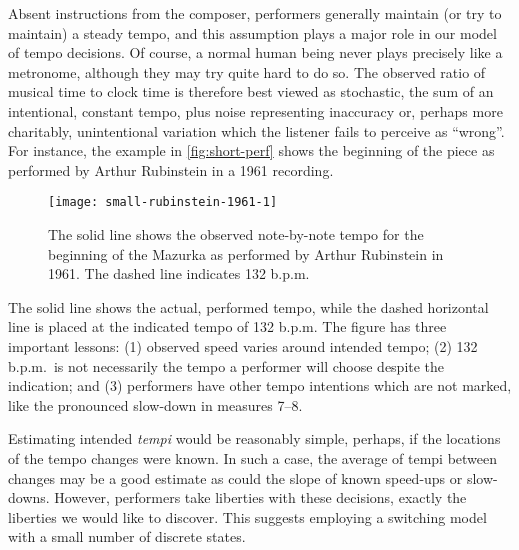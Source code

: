 \documentclass[12pt]{article}
\begin{document}
Absent instructions from the composer, performers generally maintain
(or try to maintain) a steady tempo, and this assumption plays a major
role in our model of tempo decisions. Of course, a normal human being
never plays precisely like a 
metronome, although they may try quite hard to do so. The observed
ratio of musical time to clock time
is therefore best viewed as stochastic, the sum of an
intentional, constant tempo, plus noise representing inaccuracy
or, perhaps more charitably, unintentional variation which the
listener fails to perceive as ``wrong''. For instance, the example in
\autoref{fig:short-perf} shows the beginning of the piece as performed
by Arthur Rubinstein in a 1961 recording. 
\begin{figure}[t!]
 \centering
 \texttt{[image: small-rubinstein-1961-1]}
 \caption{The solid line shows the observed note-by-note tempo for
   the beginning of the Mazurka as performed by Arthur Rubinstein in
   1961. The dashed line indicates 132 b.p.m.}
 \label{fig:short-perf}
\end{figure}
The solid line shows the
actual, performed tempo, while the dashed horizontal line is placed at
the indicated tempo of 132 b.p.m. The figure has three important
lessons: (1) observed speed varies around intended tempo; (2) 132 b.p.m.\ is
not necessarily the tempo a performer will choose despite the
indication; and (3) performers have other tempo intentions which are
not marked, like the pronounced slow-down in measures 7--8.

Estimating intended {\em tempi} would be reasonably simple, perhaps, 
if the locations of the tempo changes were known. In such a case,
the average of tempi between changes may be a good estimate as
could the slope of known speed-ups or slow-downs. However, performers
take liberties with these decisions, exactly the liberties we would
like to discover. This suggests employing a switching model with a
small number of discrete states.
\end{document}
